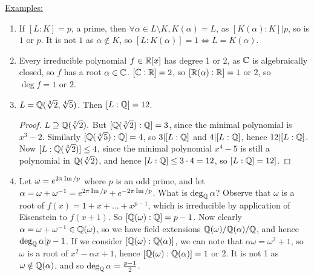 \documentclass[a4paper, 10pt, twocolumn]{amsart}
\begin{document}
\underline{Examples:}
\begin{enumerate}
\item If $[L:K] = p$, a prime, then $\forall \alpha \in L\setminus K, K(\alpha) = L$, as $[K(\alpha) : K]|p$, so is $1$ or $p$. It is not $1$ as $\alpha \notin K$, so $[L:K(\alpha)] = 1 \iff L = K(\alpha)$.
\item Every irreducible polynomial  $f \in \mathbb{R}[x]$ has degree 1 or 2, as $\mathbb{C}$ is algebraically closed, so $f$ has a root $\alpha \in \mathbb{C}$. $[\mathbb{C}:\mathbb{R}] = 2$, so $[\mathbb{R}(\alpha):\mathbb{R}] = 1$ or $2$, so $\deg f = 1$ or $2$.
\item $L = \mathbb{Q}(\sqrt[3]{2},\sqrt[4]{5})$. Then $[L:\mathbb{Q}] = 12$.
\begin{proof}
$L \supseteq \mathbb{Q}(\sqrt[3]{2}).$ But $[\mathbb{Q}(\sqrt[3]{2}):\mathbb{Q}] = 3$, since the minimal polynomial is $x^3-2$. Similarly $[\mathbb{Q}(\sqrt[4]{5}):\mathbb{Q}] = 4$, so $3|[L:\mathbb{Q}]$ and $4|[L:\mathbb{Q}]$, hence $12|[L:\mathbb{Q}]$. Now $[L:\mathbb{Q}(\sqrt[3]{2})] \leq 4$, since the minimal polynomial $x^4-5$ is still a polynomial in $\mathbb{Q}(\sqrt[3]{2})$, and hence $[L:\mathbb{Q}] \leq 3\cdot 4 = 12$, so $[L:\mathbb{Q}] = 12]$.
\end{proof}
\item Let $\omega = e^{2\pi\operatorname{Im}/p}$ where $p$ is an odd prime, and let $\alpha =\omega + \omega^{-1} = e^{2\pi\operatorname{Im}/p} + e^{-2\pi\operatorname{Im}/p}$. What is $\deg_{\mathbb{Q}} \alpha$? Observe that $\omega$ is a root of $f(x)=1+x+\ldots+x^{p-1}$, which is irreducible by application of Eisenstein to $f(x+1)$. So $[\mathbb{Q}(\omega):\mathbb{Q}] = p-1$. Now clearly $\alpha = \omega + \omega^{-1} \in \mathbb{Q}(\omega)$, so we have field extensions $\mathbb{Q}(\omega)/\mathbb{Q}(\alpha)/\mathbb{Q}$, and hence $\deg_{\mathbb{Q}} \alpha|p-1$. If we consider $[\mathbb{Q}(\omega):\mathbb{Q}(\alpha)]$, we can note that $\alpha\omega = \omega^2 + 1$, so $\omega$ is a root of $x^2-\alpha x+1$, hence $[\mathbb{Q}(\omega):\mathbb{Q}(\alpha)] = 1$ or $2$. It is not 1 as $\omega \notin \mathbb{Q}(\alpha)$, and so $\deg_{\mathbb{Q}} \alpha = \frac{p-1}{2}$.
\end{enumerate}
\end{document}
